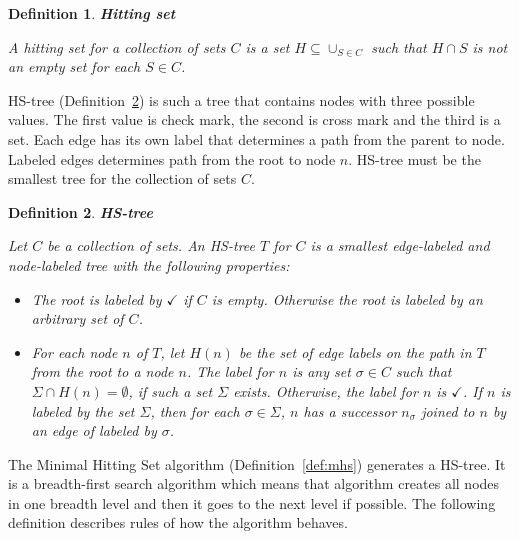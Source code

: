 \documentclass[12pt,a4paper]{article}
\newtheorem{definition}{Definition}[subsection]
\begin{document}
\begin{definition}{\textbf{Hitting set}}
	\label{def:hittingSet}
	
	A hitting set for a collection of sets $C$ is a set $H \subseteq \cup_{S \in C}$ such that $H \cap S$ is not an empty set for each $S \in C$.
\end{definition}

HS-tree (Definition~\ref{def:hsTree}) is such a tree that contains nodes with three possible values. The first value is check mark, the second is cross mark and the third is a set. Each edge has its own label that determines a path from the parent to node. Labeled edges determines path from the root to node $n$. HS-tree must be the smallest tree for the collection of sets $C$.

\begin{definition}{\textbf{HS-tree}}
	\label{def:hsTree}
	
	Let $C$ be a collection of sets. An HS-tree $T$ for $C$ is a smallest edge-labeled and node-labeled tree with the following properties:
	
	\begin{itemize}
		\item The root is labeled by $\checkmark$ if $C$ is empty. Otherwise the root is labeled by an arbitrary set of $C$.
		
		\item For each node $n$ of $T$, let $H(n)$ be the set of edge labels on the path in $T$ from the root to a node $n$. The label for $n$ is any set $\sigma \in C$ such that $\Sigma \cap H(n) = \emptyset$, if such a set $\Sigma$ exists. Otherwise, the label for $n$ is $\checkmark$. If $n$ is labeled by the set $\Sigma$, then for each $\sigma \in \Sigma$, $n$ has a successor $n_{\sigma}$ joined to $n$ by an edge of labeled by $\sigma$.
	\end{itemize}
\end{definition}

The Minimal Hitting Set algorithm (Definition~\ref{def:mhs}) generates a HS-tree. It is a breadth-first search algorithm which means that algorithm creates all nodes in one breadth level and then it goes to the next level if possible. The following definition describes rules of how the algorithm behaves.
\end{document}
